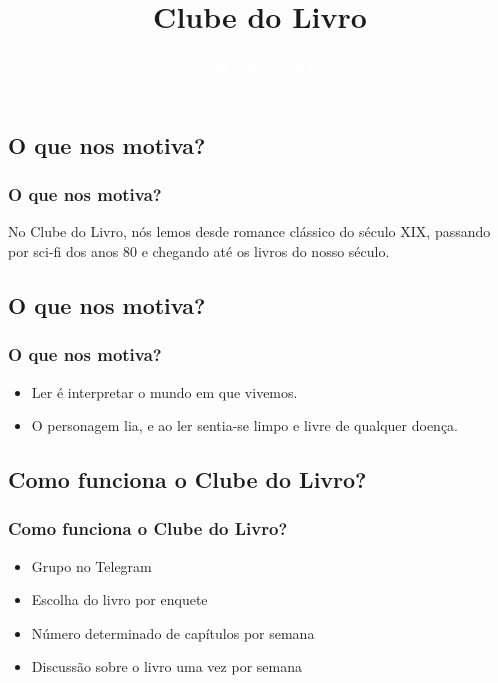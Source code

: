 \documentclass{beamer}
\title[Introdução ao \LaTeX]{\bfseries\Huge{Clube do Livro}}
\author[Milena Gomes]{\bfseries\textcolor{white}{Milena Gomes da Silva} \\
\text{\scriptsize{\textcolor{white}{milena.gomes.silva@usp.br}}}}
\date[17.06.2020]
\begin{document}

{



  \begin{frame}
    \titlepage
  \end{frame}
}



\begin{frame}

\section{O que nos motiva?}
\frametitle{{\bfseries{O que nos motiva?}}}
	\begin{tcolorbox}[colback=red!5!white, colframe=red!65!black,
		title={\sc{\bf{O que lemos?}}}]
		No Clube do Livro, nós lemos desde romance clássico do século XIX, passando por sci-fi dos anos 80 e chegando até os livros do nosso século.
	\end{tcolorbox}
\end{frame}

\begin{frame}
\section{O que nos motiva?}
\frametitle{{\bfseries{O que nos motiva?}}}
\begin{itemize}[<+->]
	\item[{\textcolor{red!90!black}{\ding{109}}}]{Ler é interpretar o mundo em que vivemos.} \cite{Paulo}
	\item[{\textcolor{red!90!black}{\ding{109}}}]{O personagem lia, e ao ler sentia-se limpo e livre de qualquer doença.}
	\cite{VHM}
\end{itemize}

\end{frame}

\begin{frame}
	\section{Como funciona o Clube do Livro?}
	\frametitle{\bfseries{Como funciona o Clube do Livro?}}
	\begin{itemize}[<+->]
		\item[{\textcolor{red!90!black}{\ding{109}}}]{Grupo no Telegram}
		\item[{\textcolor{red!90!black}{\ding{109}}}]{Escolha do livro por enquete}
		\item[{\textcolor{red!90!black}{\ding{109}}}]{Número determinado de capítulos por semana}
		\item[{\textcolor{red!90!black}{\ding{109}}}]{Discussão sobre o livro uma vez por semana}
	\end{itemize}

\end{frame}
\end{document}
